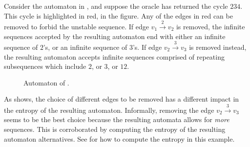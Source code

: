 \documentclass[11pt,twoside,a4paper,openright]{uclouvain-thesis}
\begin{document}
\begin{myexem}\label{exem:edge_removal_example}
Consider the automaton in , and suppose the oracle has returned the cycle $234$.
This cycle is highlighted in red, in the figure.
Any of the edges in red can be removed to forbid the unstable sequence.
If edge $v_1 \xrightarrow{2} v_2$ is removed, the infinite sequences accepted by the resulting automaton end with either an infinite sequence of $2$'s, or an infinite sequence of $3$'s.
If edge $v_2 \xrightarrow{3} v_3$ is removed instead,
the resulting automaton accepts infinite sequences comprised of repeating subsequences which include $2$, or $3$, or $12$.
\end{myexem}

\begin{figure}[tbh]
\centering
  \caption{Automaton of .}
  \label{fig:edge_removal_example}
\end{figure}

As  shows, the choice of different edges to be removed has a different impact in the entropy of the resulting automaton.
Informally, removing the edge $v_2 \xrightarrow{3} v_3$ seems to be the best choice because the resulting automata allows for \emph{more} sequences.
This is corroborated by computing the entropy of the resulting automaton alternatives.
See  for how to compute the entropy in this example.
\end{document}
